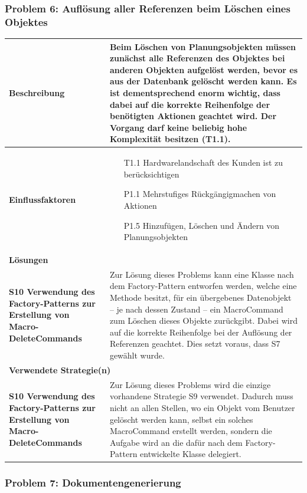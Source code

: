 \documentclass[fontsize=12pt,paper=a4,twoside]{scrartcl}
\begin{document}
\subsubsection{Problem 6: Auflösung aller Referenzen beim Löschen eines Objektes}
\begin{tabularx}{\textwidth}{|p{6cm}|X|}
 \hline
 \textbf{Beschreibung} & 
Beim Löschen von Planungsobjekten müssen zunächst alle Referenzen des Objektes bei anderen Objekten aufgelöst werden, bevor es aus der Datenbank gelöscht werden kann. Es ist dementsprechend enorm wichtig, dass dabei auf die korrekte Reihenfolge der benötigten Aktionen geachtet wird. Der Vorgang darf keine beliebig hohe Komplexität besitzen (T1.1).\\\hline
 \textbf{Einflussfaktoren} &
 \begin{itemize}
\item[T1.1] Hardwarelandschaft des Kunden ist zu berücksichtigen
\item[P1.1] Mehrstufiges Rückgängigmachen von Aktionen
\item[P1.5] Hinzufügen, Löschen und Ändern von Planungsobjekten
 \end{itemize}\\\hline
\multicolumn{2}{|l|}{\textbf{Lösungen}} \\\hline
\textbf{S10 Verwendung des Factory-Patterns zur Erstellung von Macro-DeleteCommands} & Zur Lösung dieses Problems kann eine Klasse nach dem Factory-Pattern entworfen werden, welche eine Methode besitzt, für ein übergebenes Datenobjekt -- je nach dessen Zustand -- ein MacroCommand zum Löschen dieses Objekte zurückgibt. Dabei wird auf die korrekte Reihenfolge bei der Auflösung der Referenzen geachtet. Dies setzt voraus, dass S7 gewählt wurde. \\\hline
\multicolumn{2}{|l|}{\textbf{Verwendete Strategie(n)}} \\\hline
 \textbf{S10 Verwendung des Factory-Patterns zur Erstellung von Macro-DeleteCommands}   & Zur Lösung dieses Problems wird die einzige vorhandene Strategie S9 verwendet. Dadurch muss nicht an allen Stellen, wo ein Objekt vom Benutzer gelöscht werden kann, selbst ein solches MacroCommand erstellt werden, sondern die Aufgabe wird an die dafür nach dem Factory-Pattern entwickelte Klasse delegiert. \\\hline
\end{tabularx}
\newpage

\subsubsection{Problem 7: Dokumentengenerierung}
\end{document}
